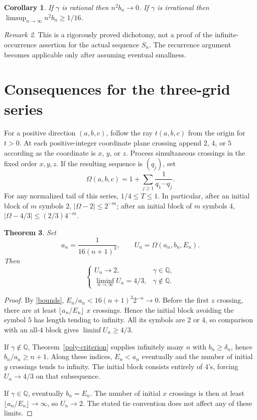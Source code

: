 \documentclass[11pt,a4paper]{article}
\newtheorem{theorem}{Theorem}[section]
\newtheorem{corollary}[theorem]{Corollary}
\theoremstyle{remark}\newtheorem{remark}[theorem]{Remark}
\newcommand{\Q}{\mathbb Q}\newcommand{\Z}{\mathbb Z}
\begin{document}
\begin{corollary}
If $\gamma$ is rational then $n^2b_n\to0$. If $\gamma$ is irrational then
$\limsup_{n\to\infty}n^2b_n\ge1/16$.
\end{corollary}
\begin{remark}
This is a rigorously proved dichotomy, not a proof of the infinite-occurrence
assertion for the actual sequence $S_n$. The recurrence argument becomes
applicable only after assuming eventual smallness.
\end{remark}

\section{Consequences for the three-grid series}
For a positive direction $(a,b,c)$, follow the ray $t(a,b,c)$ from the origin
for $t>0$. At each positive-integer coordinate plane crossing append $2$, $4$,
or $5$ according as the coordinate is $x$, $y$, or $z$. Process simultaneous
crossings in the fixed order $x,y,z$. If the resulting sequence is $(q_j)$, set
\[
 \Omega(a,b,c)=1+\sum_{j\ge1}\frac1{q_1\cdots q_j}.
\]
For any normalized tail of this series, $1/4\le T\le1$. In particular,
after an initial block of $m$ symbols $2$,
$|\Omega-2|\le 2^{-m}$; after an initial block of $m$ symbols $4$,
$|\Omega-4/3|\le(2/3)4^{-m}$.

\begin{theorem}\label{grid-limit}
Set
\[
 a_n=\frac1{16(n+1)^3},\qquad U_n=\Omega(a_n,b_n,E_n).
\]
Then
\[
 \begin{cases}
 U_n\longrightarrow2,&\gamma\in\Q,\\[2pt]
 \displaystyle\liminf_{n\to\infty}U_n=4/3,&\gamma\notin\Q.
 \end{cases}
\]
\end{theorem}
\begin{proof}
By \eqref{bounds}, $E_n/a_n<16(n+1)^3 2^{-n}\to0$. Before the first $z$ crossing,
there are at least $\lfloor a_n/E_n\rfloor$ $x$ crossings. Hence the initial
block avoiding the symbol $5$ has length tending to infinity. All its symbols
are $2$ or $4$, so comparison with an all-$4$ block gives
$\liminf U_n\ge4/3$.

If $\gamma\notin\Q$, Theorem~\ref{poly-criterion} supplies infinitely many $n$
with $b_n\ge\delta_n$, hence $b_n/a_n\ge n+1$. Along these indices,
$E_n<a_n$ eventually and the number of initial $y$ crossings tends to infinity.
The initial block consists entirely of $4$'s, forcing $U_n\to4/3$ on that
subsequence.

If $\gamma\in\Q$, eventually $b_n=E_n$. The number of initial $x$ crossings
is then at least $\lfloor a_n/E_n\rfloor\to\infty$, so $U_n\to2$.
The stated tie convention does not affect any of these limits.
\end{proof}
\end{document}

